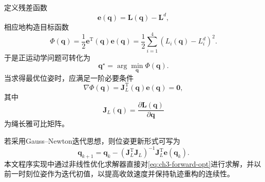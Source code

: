 定义残差函数
\begin{equation}
  \bm e(\bm q)=\bm L(\bm q)-\bm L^{d}, \label{eq:ch3-e-q}
\end{equation}
相应地构造目标函数
\begin{equation}
  \Phi(\bm q)=\frac{1}{2}\bm e^{\mathrm T}(\bm q)\bm e(\bm q) =\frac{1}{2}\sum_{i=1}^{4}\left(L_i(\bm q)-L_i^{d}\right)^2. \label{eq:ch3-forward-objective}
\end{equation}
于是正运动学问题可转化为
\begin{equation}
  \bm q^\star=\arg\min_{\bm q}\Phi(\bm q). \label{eq:ch3-forward-opt}
\end{equation}
当求得最优位姿时，应满足一阶必要条件
\begin{equation}
  \nabla\Phi(\bm q)=\bm J_L^{\mathrm T}(\bm q)\bm e(\bm q)=\bm 0, \label{eq:ch3-forward-stationary}
\end{equation}
其中
\begin{equation}
  \bm J_L(\bm q)=\frac{\partial \bm L(\bm q)}{\partial \bm q} \label{eq:ch3-jl}
\end{equation}
为绳长雅可比矩阵。

若采用Gauss--Newton迭代思想，则位姿更新形式可写为
\begin{equation}
  \bm q_{k+1} = \bm q_k- \left(\bm J_L^{\mathrm T}\bm J_L\right)^{-1} \bm J_L^{\mathrm T} \bm e(\bm q_k). \label{eq:ch3-gauss-newton}
\end{equation}
本文程序实现中通过非线性优化求解器直接对\cref{eq:ch3-forward-opt}进行求解，并以前一时刻位姿作为迭代初值，以提高收敛速度并保持轨迹重构的连续性。

